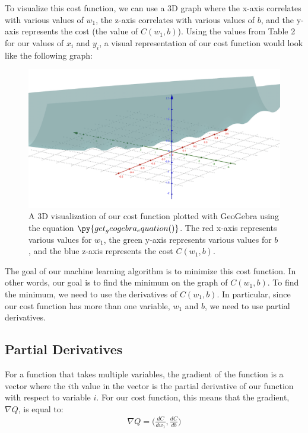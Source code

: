 \documentclass[12pt]{article}
\begin{document}
To visualize this cost function, we can use a 3D graph where the x-axis correlates with various values of $w_1$, the z-axis correlates with various values of $b$, and the y-axis represents the cost (the value of $C(w_1, b)$). Using the values from Table 2 for our values of $x_i$ and $y_i$, a visual representation of our cost function would look like the following graph:
\begin{figure}[H]
	\centering
	\caption{A 3D visualization of our cost function plotted with GeoGebra using the equation $\py{get_geogebra_equation()}$. The red x-axis represents various values for $w_1$, the green y-axis represents various values for $b$, and the blue z-axis represents the cost $C(w_1, b)$.}
	\includegraphics[width=\linewidth]{3d-plot.png}
\end{figure}

The goal of our machine learning algorithm is to minimize this cost function. In other words, our goal is to find the minimum on the graph of $C(w_1, b)$. To find the minimum, we need to use the derivatives of $C(w_1, b)$. In particular, since our cost function has more than one variable, $w_1$ and $b$, we need to use partial derivatives.

\subsection*{Partial Derivatives}

For a function that takes multiple variables, the gradient of the function is a vector where the $i$th value in the vector is the partial derivative of our function with respect to variable $i$. For our cost function, this means that the gradient, $\nabla Q$, is equal to:
\begin{align*}
	\nabla Q = \Big(\frac{dC}{dw_1}, \frac{dC}{db}\Big)
\end{align*}
\end{document}
